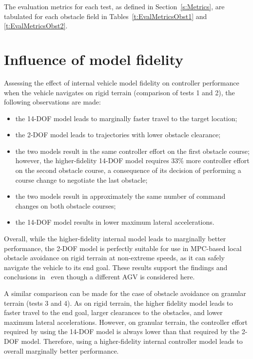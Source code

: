 \documentclass[12pt,onecolumn]{report}
\begin{document}
The evaluation metrics for each test, as defined in Section~\ref{s:Metrics}, are tabulated for each obstacle field in Tables~\ref{t:EvalMetricsObst1} and \ref{t:EvalMetricsObst2}. 

\section{Influence of model fidelity}

Assessing the effect of internal vehicle model fidelity on controller performance when the vehicle navigates on rigid terrain (comparison of tests 1 and 2), the following observations are made:
\begin{itemize}
\item the 14-DOF model leads to marginally faster travel to the target location;
\item the 2-DOF model leads to trajectories with lower obstacle clearance;
\item the two models result in the same controller effort on the first obstacle course; however, the higher-fidelity 14-DOF model requires 33\% more controller effort on the second obstacle course, a consequence of its decision of performing a course change to negotiate the last obstacle;
\item the two models result in approximately the same number of command changes on both obstacle courses;
\item the 14-DOF model results in lower maximum lateral accelerations.
\end{itemize}

Overall, while the higher-fidelity internal model leads to marginally better performance, the 2-DOF model is perfectly suitable for use in MPC-based local obstacle avoidance on rigid terrain at non-extreme speeds, as it can safely navigate the vehicle to its end goal. These results support the findings and conclusions in~\cite{ModelFidelity2016} even though a different AGV is considered here.

A similar comparison can be made for the case of obstacle avoidance on granular terrain (tests 3 and 4).  As on rigid terrain, the higher fidelity model leads to faster travel to the end goal, larger clearances to the obstacles, and lower maximum lateral accelerations.  However, on granular terrain, the controller effort required by using the 14-DOF model is always lower than that required by the 2-DOF model.  Therefore, using a higher-fidelity internal controller model leads to overall marginally better performance.
\end{document}
